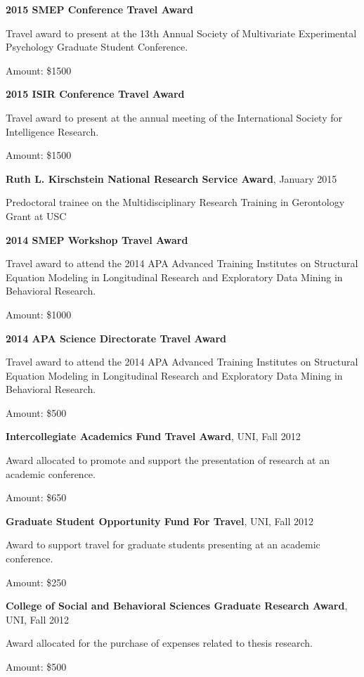 \documentclass[letterpaper,10pt]{article}
\begin{document}
  \begin{center}
  	\parbox{6.5in}{\textbf{2015 SMEP Conference Travel Award}}
  	\parbox{6.5in}{Travel award to present at the 13th Annual Society of Multivariate Experimental Psychology Graduate Student Conference.}
  	\parbox{6.5in}{Amount: \$1500}
  \end{center}
  \begin{center}
  	\parbox{6.5in}{\textbf{2015 ISIR Conference Travel Award}}
  	\parbox{6.5in}{Travel award to present at the annual meeting of the International Society for Intelligence Research.}
  	\parbox{6.5in}{Amount: \$1500}
  \end{center}
 \begin{center}
  \parbox{6.5in}{\textbf{Ruth L. Kirschstein National Research Service Award}, January 2015}
     \parbox{6.5in}{Predoctoral trainee on the Multidisciplinary Research Training in Gerontology Grant at USC}
 \end{center}
 \begin{center}
  \parbox{6.5in}{\textbf{2014 SMEP Workshop Travel Award}}
     \parbox{6.5in}{Travel award to attend the 2014 APA Advanced Training Institutes on Structural Equation Modeling in Longitudinal Research and Exploratory Data Mining in Behavioral Research. }
\parbox{6.5in}{Amount: \$1000}
 \end{center}
  \begin{center}
  \parbox{6.5in}{\textbf{2014 APA Science Directorate Travel Award}}
    \parbox{6.5in}{Travel award to attend the 2014 APA Advanced Training Institutes on Structural Equation Modeling in Longitudinal Research and Exploratory Data Mining in Behavioral Research.}
\parbox{6.5in}{Amount: \$500}
 \end{center}
 \begin{center}
  \parbox{6.5in}{\textbf{Intercollegiate Academics Fund Travel Award}, UNI, Fall 2012}
   \parbox{6.5in}{Award allocated to promote and support the presentation of research at an academic conference.}
\parbox{6.5in}{Amount: \$650}
 \end{center}
\begin{center}
  \parbox{6.5in}{\textbf{Graduate Student Opportunity Fund For Travel}, UNI, Fall 2012}
   \parbox{6.5in}{Award to support travel for graduate students presenting at an academic conference.}
  \parbox{6.5in}{Amount: \$250}
 \end{center}
\begin{center}
  \parbox{6.5in}{\textbf{College of Social and Behavioral Sciences Graduate Research Award}, UNI, Fall 2012}
   \parbox{6.5in}{Award allocated for the purchase of expenses related to thesis research.}
  \parbox{6.5in}{Amount: \$500}
 \end{center}
\end{document}
